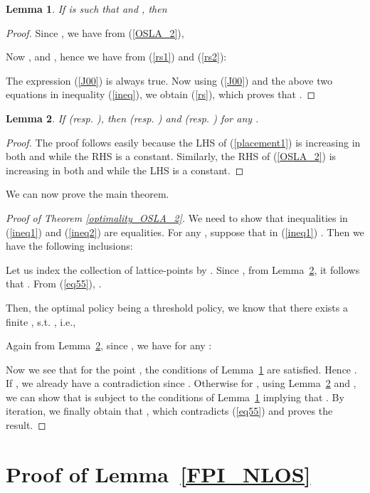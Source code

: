 \documentclass[conference]{IEEEtran}
\newtheorem{lemma}{Lemma}
\begin{document}
\begin{lemma}
\label{lem33}
If  is such that  and 
, then 
\end{lemma}

\begin{proof}
Since , we have from (\ref{OSLA_2}),

Now , and , hence we have from (\ref{rs1}) and (\ref{rs2}):

The expression (\ref{J00}) is always true. Now using (\ref{J00}) and the above two equations in inequality (\ref{ineq}), we obtain (\ref{rs}), which proves that .
\end{proof}

\begin{lemma} \label{lemma:mplusk}
If  (resp. ), then  (resp. ) and  (resp. ) for any .
\end{lemma}
\begin{proof}
The proof follows easily because the LHS of (\ref{placement1}) is increasing in both  and  while the RHS is a constant. Similarly, the RHS of (\ref{OSLA_2}) is increasing in both  and  while the LHS is a constant. 
\end{proof}

We can now prove the main theorem. 

\begin{proof}[Proof of Theorem \ref{optimality_OSLA_2}]
We need to show that inequalities in (\ref{ineq1}) and (\ref{ineq2}) are equalities. For any , suppose that in (\ref{ineq1}) . Then we have the following inclusions: 

Let us index the collection of lattice-points  by . Since , from Lemma~\ref{lemma:mplusk}, it follows that . From (\ref{eq55}), .

Then, the optimal policy being a threshold policy, we know that there exists a finite , s.t. , i.e.,

Again from Lemma~\ref{lemma:mplusk}, since , we have for any :

Now we see that for the point , the conditions of Lemma~\ref{lem33} are satisfied. Hence . If , we already have a contradiction since . Otherwise for , using Lemma~\ref{lemma:mplusk} and , we can show that 
 is subject to the conditions of Lemma~\ref{lem33} implying that . By iteration, we finally obtain that , which contradicts (\ref{eq55}) and proves the result. 
\end{proof}





\section{Proof of Lemma~\ref{FPI_NLOS}}
\label{FPI_NLOS_appendix}
\end{document}
